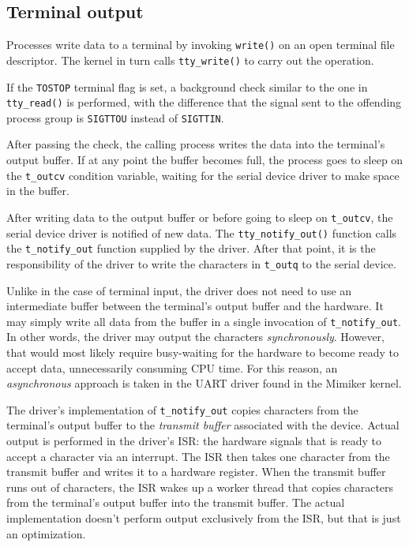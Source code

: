 \documentclass[shortabstract, manyadvisors, english, mgr]{iithesis}
\begin{document}
\subsection{Terminal output}

Processes write data to a terminal by invoking \texttt{write()} on an open
terminal file descriptor. The kernel in turn calls \texttt{tty\_write()} to
carry out the operation.

If the \texttt{TOSTOP} terminal flag is set, a background check similar to the
one in \texttt{tty\_read()} is performed, with the difference that the signal
sent to the offending process group is \texttt{SIGTTOU} instead of
\texttt{SIGTTIN}.

After passing the check, the calling process writes the data into the terminal's
output buffer. If at any point the buffer becomes full, the process goes to
sleep on the \texttt{t\_outcv} condition variable, waiting for the serial device
driver to make space in the buffer.

After writing data to the output buffer or before going to sleep on
\texttt{t\_outcv}, the serial device driver is notified of new data. The
\texttt{tty\_notify\_out()} function calls the \texttt{t\_notify\_out} function
supplied by the driver. After that point, it is the responsibility of the driver
to write the characters in \texttt{t\_outq} to the serial device.

Unlike in the case of terminal input, the driver does not need to use an
intermediate buffer between the terminal's output buffer and the hardware. It
may simply write all data from the buffer in a single invocation of
\texttt{t\_notify\_out}. In other words, the driver may output the characters
\textit{synchronously}. However, that would most likely require busy-waiting for
the hardware to become ready to accept data, unnecessarily consuming CPU time.
For this reason, an \textit{asynchronous} approach is taken in the UART driver
found in the Mimiker kernel.

The driver's implementation of \texttt{t\_notify\_out} copies characters from
the terminal's output buffer to the \textit{transmit buffer} associated with the
device. Actual output is performed in the driver's ISR: the hardware signals
that is ready to accept a character via an interrupt. The ISR then takes one
character from the transmit buffer and writes it to a hardware register. When
the transmit buffer runs out of characters, the ISR wakes up a worker thread
that copies characters from the terminal's output buffer into the transmit
buffer. The actual implementation doesn't perform output exclusively from the
ISR, but that is just an optimization.
\end{document}
